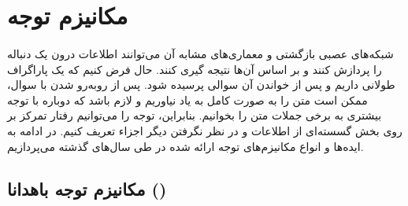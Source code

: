 \section{مکانیزم توجه}
\label{sec:attn}
\paragraph{}{
    شبکه‌های عصبی بازگشتی و معماری‌های مشابه آن می‌توانند اطلاعات درون یک 
    دنباله را پردازش کنند و بر اساس آن‌ها نتیجه گیری کنند. حال فرض کنیم
    که یک پاراگراف طولانی داریم و پس از خواندن آن سوالی پرسیده شود.
    پس از روبه‌رو شدن با سوال، ممکن است متن را به صورت کامل به یاد نیاوریم
    و لازم باشد که دوباره با توجه بیشتری به برخی جملات متن را بخوانیم.
    بنابراین، توجه را می‌توانیم رفتار تمرکز بر روی بخش گسسته‌ای از اطلاعات 
    و در نظر نگرفتن دیگر اجزاء تعریف کنیم. در ادامه به ایده‌ها و انواع 
    مکانیزم‌های توجه ارائه شده در طی سال‌های گذشته می‌پردازیم.
}
\subsection{
    مکانیزم توجه باهدانا 
    ()
}
\label{subsec:bahdanau_attn}
